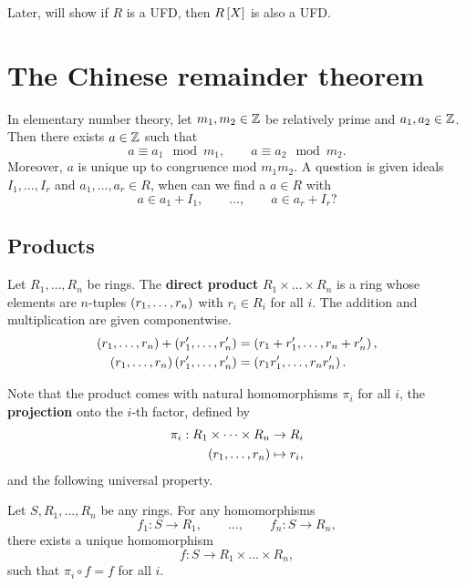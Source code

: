 Later, will show if $ R $ is a UFD, then $ R\sb{X} $ is also a UFD.

\pagebreak

\section{The Chinese remainder theorem}

In elementary number theory, let $ m_1, m_2 \in \Z $ be relatively prime and $ a_1, a_2 \in \Z $. Then there exists $ a \in \Z $ such that
$$ a \equiv a_1 \mod m_1, \qquad a \equiv a_2 \mod m_2. $$
Moreover, $ a $ is unique up to congruence mod $ m_1m_2 $. A question is given ideals $ I_1, \dots, I_r $ and $ a_1, \dots, a_r \in R $, when can we find a $ a \in R $ with
$$ a \in a_1 + I_1, \qquad \dots, \qquad a \in a_r + I_r? $$

\subsection{Products}

\begin{definition}
Let $ R_1, \dots, R_n $ be rings. The \textbf{direct product} $ R_1 \times \dots \times R_n $ is a ring whose elements are $ n $-tuples $ \rb{r_1, \dots, r_n} $ with $ r_i \in R_i $ for all $ i $. The addition and multiplication are given componentwise.
\begin{align*}
\rb{r_1, \dots, r_n} + \rb{r_1', \dots, r_n'} & = \rb{r_1 + r_1', \dots, r_n + r_n'}, \\
\rb{r_1, \dots, r_n}\rb{r_1', \dots, r_n'} & = \rb{r_1r_1', \dots, r_nr_n'}.
\end{align*}
\end{definition}

Note that the product comes with natural homomorphisms $ \pi_i $ for all $ i $, the \textbf{projection} onto the $ i $-th factor, defined by
\begin{align*}
\pi_i : R_1 \times \dots \times R_n & \to R_i \\
\rb{r_1, \dots, r_n} & \mapsto r_i,
\end{align*}
and the following universal property.

\begin{theorem}
Let $ S, R_1, \dots, R_n $ be any rings. For any homomorphisms
$$ f_1 : S \to R_1, \qquad \dots, \qquad f_n : S \to R_n, $$
there exists a unique homomorphism
$$ f : S \to R_1 \times \dots \times R_n, $$
such that $ \pi_i \circ f = f $ for all $ i $.
\end{theorem}


